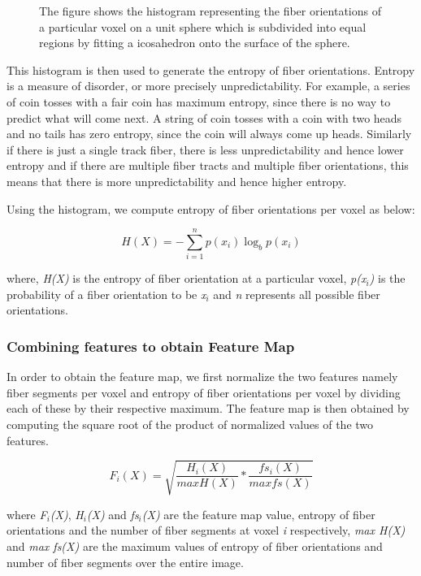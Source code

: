\documentclass{llncs}
\begin{document}
\begin{figure}
\centering
{}
\caption{The figure shows the histogram representing the fiber orientations of a particular voxel on a unit sphere which
is subdivided into equal regions by fitting a icosahedron onto the surface of the sphere.}
\end{figure}
%
This histogram is then used to generate the entropy of fiber orientations. Entropy is a measure of disorder, or more 
precisely unpredictability.  For example, a series of coin tosses with a fair coin has maximum entropy, since there 
is no way to predict what will come next. A string of coin tosses with a coin with two heads and no tails has zero 
entropy, since the coin will always come up heads. Similarly if there is just a single track fiber, there is less 
unpredictability and hence lower entropy and if there are multiple fiber tracts and multiple fiber orientations, 
this means that there is more unpredictability and hence higher entropy. 
 
Using the histogram, we compute entropy of fiber orientations per voxel as below: 
 
\begin{equation}
H(X) = - \sum_{i=1}^n p(x_i) \log_{b} p(x_i) 
\end{equation}

where, \textit{H(X)} is the entropy of fiber orientation at a particular voxel, \textit{p(x$_{i}$)} is the probability of a fiber 
orientation to be \textit{x$_{i}$} and \textit{n} represents all possible fiber orientations. 

%
\subsubsection{Combining features to obtain Feature Map}
%
In order to obtain the feature map, we first normalize the two features namely fiber segments per voxel and entropy
of fiber orientations per voxel by dividing each of these by their respective maximum. The feature map is then obtained
by computing the square root of the product of normalized values of the two features.

\begin{equation}
F_i(X) = \sqrt {\frac{H_i(X)}{max  H(X)} * \frac{fs_i(X)}{max  fs(X)} }
\end{equation}

where \textit{F$_i$(X)}, \textit{H$_i$(X)} and \textit{fs$_i$(X)} are the feature map value, entropy of fiber orientations 
and the number of fiber segments at voxel \textit{i} respectively, \textit{max H(X)} and \textit{max fs(X)} are the maximum values of
entropy of fiber orientations and number of fiber segments over the entire image. 
\end{document}
